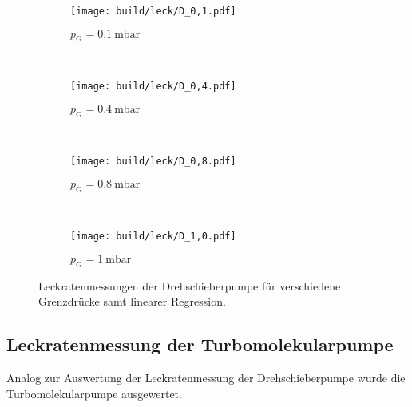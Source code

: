 \begin{figure}
  \centering
  \begin{subfigure}[b]{0.48\textwidth}
    \texttt{[image: build/leck/D\_0,1.pdf]}
    \caption{$p_\text{G} = \SI{0.1}{\milli\bar}$}
  \end{subfigure}
  ~ %
  \begin{subfigure}[b]{0.48\textwidth}
    \texttt{[image: build/leck/D\_0,4.pdf]}
    \caption{$p_\text{G} = \SI{0.4}{\milli\bar}$}
  \end{subfigure}
  \\
  \begin{subfigure}[b]{0.48\textwidth}
    \texttt{[image: build/leck/D\_0,8.pdf]}
    \caption{$p_\text{G} = \SI{0.8}{\milli\bar}$}
  \end{subfigure}
  ~ %
  \begin{subfigure}[b]{0.48\textwidth}
    \texttt{[image: build/leck/D\_1,0.pdf]}
    \caption{$p_\text{G} = \SI{1}{\milli\bar}$}
  \end{subfigure}
  \caption{Leckratenmessungen der Drehschieberpumpe für verschiedene Grenzdrücke samt linearer Regression.}
  \label{fig:leck_D}
\end{figure}


\FloatBarrier

\subsection{Leckratenmessung der Turbomolekularpumpe}
\label{sec:AuswLeckT}

Analog zur Auswertung der Leckratenmessung der Drehschieberpumpe wurde die
Turbomolekularpumpe ausgewertet.






